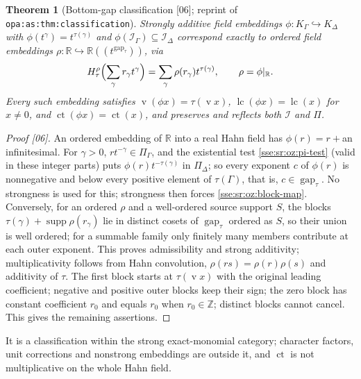 \documentclass[11pt,a4paper]{article}
\numberwithin{equation}{section}
\theoremstyle{plain}
\newtheorem{theorem}{Theorem}[section]
\theoremstyle{definition}
\theoremstyle{remark}
\newcommand{\R}{\mathbb{R}}
\newcommand{\Z}{\mathbb{Z}}
\newcommand{\supp}{\operatorname{supp}}
\newcommand{\val}{\operatorname{v}}
\newcommand{\lbl}[1]{\nolinkurl{#1}}%
\newcommand{\src}[1]{\textup{\textsf{\small[#1]}}}%
\newcommand{\ctsr}{\operatorname{ct}}%
\newcommand{\lcsr}{\operatorname{lc}}%
\newcommand{\gapsr}{\operatorname{gap}}%
\begin{document}
\begin{theorem}[Bottom-gap classification \src{06}; reprint of \lbl{opa:as:thm:classification}]\label{sse:sr:oz:classification}
Strongly additive field embeddings $\phi:K_\Gamma\hookrightarrow K_\Delta$ with
$\phi(t^\gamma)=t^{\tau(\gamma)}$ and $\phi(\mathcal I_\Gamma)\subseteq\mathcal I_\Delta$
correspond exactly to ordered field embeddings
$\rho:\R\hookrightarrow\R((t^{\gapsr_\tau}))$, via
\begin{equation}\label{sse:sr:oz:block-map}
 H^{\rho}_{\tau}\Bigl(\sum_\gamma r_\gamma t^\gamma\Bigr)=\sum_\gamma\rho(r_\gamma)t^{\tau(\gamma)},
 \qquad \rho=\phi|_\R .
\end{equation}
Every such embedding satisfies $\val(\phi x)=\tau(\val x)$,
$\lcsr(\phi x)=\lcsr(x)$ for $x\ne0$, and $\ctsr(\phi x)=\ctsr(x)$, and preserves and
reflects both $\mathcal I$ and $\Pi$.
\end{theorem}
\begin{proof}[Proof \src{06}]
An ordered embedding of $\R$ into a real Hahn field has $\phi(r)=r+{}$an
infinitesimal. For $\gamma>0$, $rt^{-\gamma}\in\Pi_\Gamma$, and the existential
test \eqref{sse:sr:oz:pi-test} (valid in these integer parts) puts
$\phi(r)t^{-\tau(\gamma)}$ in $\Pi_\Delta$; so every exponent $c$ of $\phi(r)$ is
nonnegative and below every positive element of $\tau(\Gamma)$, that is,
$c\in\gapsr_\tau$. No strongness is used for this; strongness then forces
\eqref{sse:sr:oz:block-map}. Conversely, for an ordered $\rho$ and a well-ordered
source support $S$, the blocks $\tau(\gamma)+\supp\rho(r_\gamma)$ lie in distinct
cosets of $\gapsr_\tau$ ordered as $S$, so their union is well ordered; for a
summable family only finitely many members contribute at each outer exponent.
This proves admissibility and strong additivity; multiplicativity follows from
Hahn convolution, $\rho(rs)=\rho(r)\rho(s)$ and additivity of $\tau$. The first
block starts at $\tau(\val x)$ with the original leading coefficient; negative
and positive outer blocks keep their sign; the zero block has constant
coefficient $r_0$ and equals $r_0$ when $r_0\in\Z$; distinct blocks cannot
cancel. This gives the remaining assertions.
\end{proof}
It is a classification within the strong exact-monomial category; character
factors, unit corrections and nonstrong embeddings are outside it, and $\ctsr$
is not multiplicative on the whole Hahn field.
\end{document}
